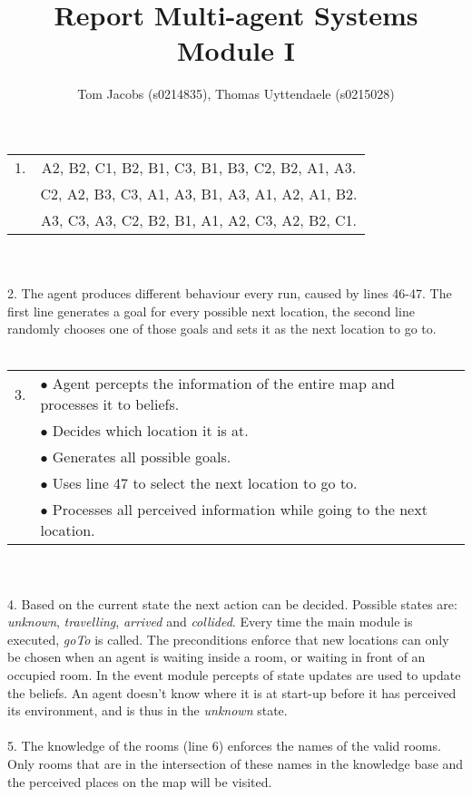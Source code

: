 \documentclass[10pt,a4paper]{article}
\title{Report Multi-agent Systems Module I}
\author{Tom Jacobs (s0214835), Thomas Uyttendaele (s0215028)}
\begin{document}
\maketitle
\part{}
\begin{tabular}{ l c }
1. & A2, B2, C1, B2, B1, C3, B1, B3, C2, B2, A1, A3.\\
 & C2, A2, B3, C3, A1, A3, B1, A3, A1, A2, A1, B2.\\
 & A3, C3, A3, C2, B2, B1, A1, A2, C3, A2, B2, C1.
\end{tabular}\\\\
\hphantom{1}2. The agent produces different behaviour every run, caused by lines 46-47.
The first line generates a goal for every possible next location, the second line randomly chooses one of those goals and sets it as the next location to go to.\\\\
\begin{tabular}{ l l }
3. & $\bullet$ Agent percepts the information of the entire map and processes it to beliefs.\\
 & $\bullet$ Decides which location it is at.\\
 & $\bullet$ Generates all possible goals.\\
 & $\bullet$ Uses line 47 to select the next location to go to.\\
 & $\bullet$ Processes all perceived information while going to the next location.
\end{tabular}\\\\
\hphantom{1}4. Based on the current state the next action can be decided. Possible states are: \emph{unknown}, \emph{travelling}, \emph{arrived} and \emph{collided}.
Every time the main module is executed, \emph{goTo} is called. The preconditions enforce that new locations can only be chosen when an agent is waiting inside a room, or waiting in front of an occupied room.
In the event module percepts of state updates are used to update the beliefs.
An agent doesn't know where it is at start-up before it has perceived its environment, and is thus in the \emph{unknown} state.\\
\\
\hphantom{1}5. The knowledge of the rooms (line 6) enforces the names of the valid rooms. 
Only rooms that are in the intersection of these names in the knowledge base and the perceived places on the map will be visited.
\end{document}
